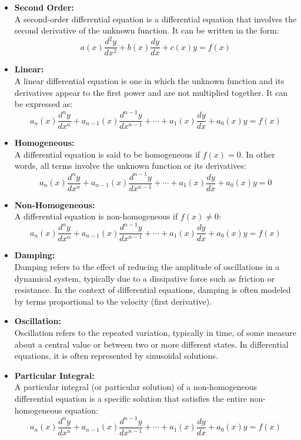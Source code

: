 \documentclass[a4paper,12pt]{article}
\begin{document}
\begin{itemize}
    \item \textbf{Second Order:}\\
A second-order differential equation is a differential equation that involves the second derivative of the unknown function. It can be written in the form:
\[
a(x) \frac{d^2y}{dx^2} + b(x) \frac{dy}{dx} + c(x)y = f(x)
\]

\item \textbf{Linear:}\\
A linear differential equation is one in which the unknown function and its derivatives appear to the first power and are not multiplied together. It can be expressed as:
\[
a_n(x) \frac{d^n y}{dx^n} + a_{n-1}(x) \frac{d^{n-1} y}{dx^{n-1}} + \cdots + a_1(x) \frac{dy}{dx} + a_0(x) y = f(x)
\]

\item \textbf{Homogeneous:}\\
A differential equation is said to be homogeneous if \( f(x) = 0 \). In other words, all terms involve the unknown function or its derivatives:
\[
a_n(x) \frac{d^n y}{dx^n} + a_{n-1}(x) \frac{d^{n-1} y}{dx^{n-1}} + \cdots + a_1(x) \frac{dy}{dx} + a_0(x) y = 0
\]

\item \textbf{Non-Homogeneous:}\\
A differential equation is non-homogeneous if \( f(x) \neq 0 \):
\[
a_n(x) \frac{d^n y}{dx^n} + a_{n-1}(x) \frac{d^{n-1} y}{dx^{n-1}} + \cdots + a_1(x) \frac{dy}{dx} + a_0(x) y = f(x)
\]

\item \textbf{Damping:}\\
Damping refers to the effect of reducing the amplitude of oscillations in a dynamical system, typically due to a dissipative force such as friction or resistance. In the context of differential equations, damping is often modeled by terms proportional to the velocity (first derivative).

\item \textbf{Oscillation:}\\
Oscillation refers to the repeated variation, typically in time, of some measure about a central value or between two or more different states. In differential equations, it is often represented by sinusoidal solutions.

\item \textbf{Particular Integral:}\\
A particular integral (or particular solution) of a non-homogeneous differential equation is a specific solution that satisfies the entire non-homogeneous equation:
\[
a_n(x) \frac{d^n y}{dx^n} + a_{n-1}(x) \frac{d^{n-1} y}{dx^{n-1}} + \cdots + a_1(x) \frac{dy}{dx} + a_0(x) y = f(x)
\]


\end{itemize}
\end{document}
